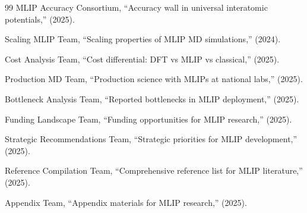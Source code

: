 \documentclass[11pt,a4paper]{article}
\begin{document}
\begin{thebibliography}{99}
MLIP Accuracy Consortium, ``Accuracy wall in universal interatomic potentials,'' (2025).

Scaling MLIP Team, ``Scaling properties of MLIP MD simulations,'' (2024).

Cost Analysis Team, ``Cost differential: DFT vs MLIP vs classical,'' (2025).

Production MD Team, ``Production science with MLIPs at national labs,'' (2025).

Bottleneck Analysis Team, ``Reported bottlenecks in MLIP deployment,'' (2025).

Funding Landscape Team, ``Funding opportunities for MLIP research,'' (2025).

Strategic Recommendations Team, ``Strategic priorities for MLIP development,'' (2025).

Reference Compilation Team, ``Comprehensive reference list for MLIP literature,'' (2025).

Appendix Team, ``Appendix materials for MLIP research,'' (2025).

\end{thebibliography}
\end{document}
